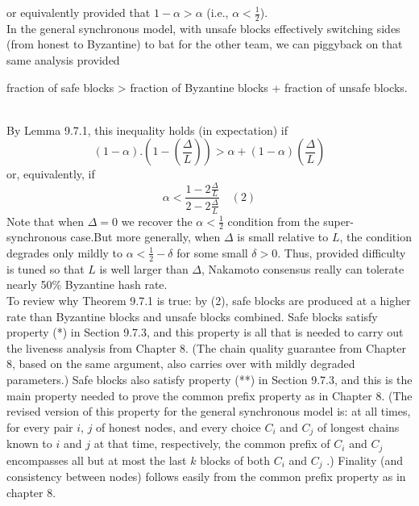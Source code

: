 or equivalently provided that $1 - \alpha > \alpha$ (i.e., $\alpha < \frac{1}{2}$).\\

In the general synchronous model, with unsafe blocks effectively switching sides (from
honest to Byzantine) to bat for the other team, we can piggyback on that same analysis
provided
\begin{center}
    fraction of safe blocks > fraction of Byzantine blocks + fraction of unsafe blocks.
\end{center}\\
By Lemma 9.7.1, this inequality holds (in expectation) if
$$(1 - \alpha) . (1 - (\frac{\Delta}{L})) > \alpha + (1 - \alpha)(\frac{\Delta}{L}) $$
or, equivalently, if
$$\alpha < \frac{1 - 2\frac{\Delta}{L}}{2 - 2\frac{\Delta}{L}} \quad (2)$$
Note that when $\Delta = 0$ we recover the $\alpha < \frac{1}{2}$
condition from the super-synchronous case.But more generally, when $\Delta$ is small relative to $L$, the condition degrades only mildly to
$\alpha < \frac{1}{2} - \delta$ for some small $\delta > 0$. Thus, provided difficulty is tuned so that $L$ is well larger
than $\Delta$, Nakamoto consensus really can tolerate nearly 50\% Byzantine hash rate.\\

To review why Theorem 9.7.1 is true: by (2), safe blocks are produced at a higher rate than
Byzantine blocks and unsafe blocks combined. Safe blocks satisfy property (*) in Section 9.7.3,
and this property is all that is needed to carry out the liveness analysis from Chapter 8. (The chain quality guarantee from Chapter 8, based on the same argument, also carries over with mildly
degraded parameters.)
Safe blocks also satisfy property (**) in Section 9.7.3, and this is the main property needed
to prove the common prefix property as in Chapter 8. (The revised version of this property for the general synchronous model is: at all times, for every pair $i$, $j$
of honest nodes, and every choice $C_i$ and $C_j$ of longest chains known to $i$ and $j$ at that time, respectively,
the common prefix of $C_i$ and $C_j$ encompasses all but at most the last $k$ blocks of both $C_i$ and $C_j$ .) Finality (and consistency between
nodes) follows easily from the common prefix property as in chapter 8.\\

